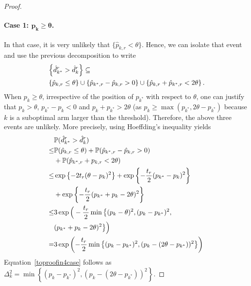 \begin{proof}
\paragraph{Case 1: $\bm{p_k \geq \theta}$.} In that case, it is very unlikely that $\{\hat{p}_{k,r} < \theta\}$. Hence, we can isolate that event and use the previous decomposition to write
\begin{align*}
&\Set{\hat{d}^r_{k^*} > \hat{d}^r_k} \subseteq 
\\
&\Set{\hat{p}_{k,r} \le \theta} \cup \Set{\hat{p}_{{k^*},r} - \hat{p}_{k,r} > 0}
		\cup \Set{\hat{p}_{k,r} + \hat{p}_{{k^*},r} < 2\theta}
		.
\end{align*}
When $p_k \geq \theta$, irrespective of the position of $p_{k^*}$ with respect to $\theta$, one can justify that $p_k > \theta$, $p_{k^*} - p_{k} < 0$ and ${p}_{k} + {p}_{{k^*}} > 2\theta$ (as $p_k \geq \max(p_{k^*},2\theta - p_{k^*})$ because $k$ is a suboptimal arm larger than the threshold). Therefore, the above three events are unlikely. More precisely, using Hoeffding's inequality yields  
\begin{align*}
&\mathbb{P}(\hat{d}^r_{k^*} > \hat{d}^r_k) 
\\ \leq &
	\mathbb{P}(\hat{p}_{k,r} \le \theta)
	+ \mathbb{P}(\hat{p}_{{k^*},r} - \hat{p}_{k,r} > 0)
\\&	+ \mathbb{P}(\hat{p}_{k^*,r} + p_{k,r} < 2\theta)
\\ \leq &
	\exp\left\{ -2t_r (\theta - p_k)^2 \right\}
	+ \exp\left\{ - \frac{t_r}{2} (p_{k^*} - p_k)^2 \right\}
\\
	&+ \exp\left\{ - \frac{t_r}{2} (p_{k^*} + p_k - 2\theta )^2 \right\}
\\ \leq &
	3 \exp\Big( -\frac{t_r}{2} \min\big\{(p_{k} - \theta)^2,
		(p_{k} - p_{k^*})^2,
\\&		(p_{k^*}+ p_k - 2\theta)^2
	  \big\} \Big)
\\ = &
	3 \exp\left( -\frac{t_r}{2} \min\left\{
		(p_{k} - p_{k^*})^2,
		(p_{k} - (2\theta - p_{k^*}))^2
	  \right\} \right)
\end{align*}
Equation~\eqref{toproofin4case} follows as $\Delta_k^2 = \min\left\{
		(p_{k} - p_{k^*})^2,
		(p_{k} - (2\theta - p_{k^*}))^2
	  \right\}$. 


\end{proof}
